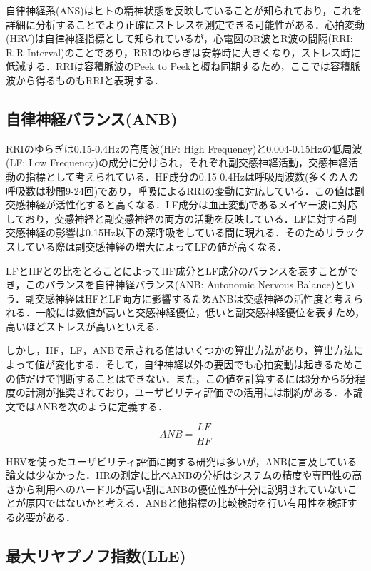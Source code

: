 自律神経系(ANS)はヒトの精神状態を反映していることが知られており，これを詳細に分析することでより正確にストレスを測定できる可能性がある．心拍変動(HRV)は自律神経指標として知られているが，心電図のR波とR波の間隔(RRI: R-R Interval)のことであり，RRIのゆらぎは安静時に大きくなり，ストレス時に低減する\cite{nakagawa}．RRIは容積脈波のPeek to Peekと概ね同期するため，ここでは容積脈波から得るものもRRIと表現する．

\subsection{自律神経バランス(ANB)}

RRIのゆらぎは0.15-0.4Hzの高周波(HF: High Frequency)と0.004-0.15Hzの低周波(LF: Low Frequency)の成分に分けられ，それぞれ副交感神経活動，交感神経活動の指標として考えられている\cite{yamaguchi}．HF成分の0.15-0.4Hzは呼吸周波数(多くの人の呼吸数は秒間9-24回)であり，呼吸によるRRIの変動に対応している．この値は副交感神経が活性化すると高くなる\cite{lehrer}．LF成分は血圧変動であるメイヤー波に対応しており，交感神経と副交感神経の両方の活動を反映している．LFに対する副交感神経の影響は0.15Hz以下の深呼吸をしている間に現れる．そのためリラックスしている際は副交感神経の増大によってLFの値が高くなる\cite{trytech}．

LFとHFとの比をとることによってHF成分とLF成分のバランスを表すことができ，このバランスを自律神経バランス(ANB: Autonomic Nervous Balance)という．副交感神経はHFとLF両方に影響するためANBは交感神経の活性度と考えられる\cite{yamaguchi}．一般には数値が高いと交感神経優位，低いと副交感神経優位を表すため，高いほどストレスが高いといえる．

しかし，HF，LF，ANBで示される値はいくつかの算出方法があり，算出方法によって値が変化する．そして，自律神経以外の要因でも心拍変動は起きるためこの値だけで判断することはできない．また，この値を計算するには3分から5分程度の計測が推奨されており\cite{nakagawa}，ユーザビリティ評価での活用には制約がある．本論文ではANBを次のように定義する．

\begin{equation}
ANB= \frac{LF}{HF} 
\end{equation}

HRVを使ったユーザビリティ評価に関する研究は多いが，ANBに言及している論文は少なかった\cite{lei2020}\cite{wollmann}．HRの測定に比べANBの分析はシステムの精度や専門性の高さから利用へのハードルが高い割にANBの優位性が十分に説明されていないことが原因ではないかと考える．ANBと他指標の比較検討を行い有用性を検証する必要がある．

\subsection{最大リヤプノフ指数(LLE)}

